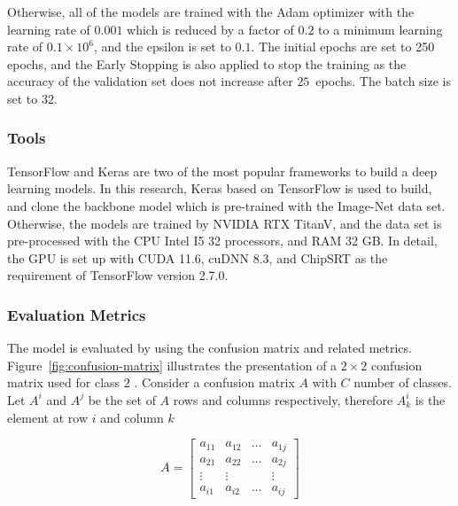 \documentclass[sensors,article,accept,pdftex,moreauthors]{Definitions/mdpi}
\begin{document}
	Otherwise, all of the models are trained with the Adam {optimizer} %
 \cite{6980} with the learning rate of $0.001$ which is reduced by a factor of $0.2$ to a minimum learning rate of $0.1 \times 10^6$, and the epsilon is set to $0.1$. The initial epochs are set to 250 epochs, and the Early Stopping is also applied to stop the training as the accuracy of the validation set does not increase after $25$~epochs. The batch size is set to $32$.
	
	\subsubsection{Tools}
	TensorFlow and Keras are two of the most popular frameworks to build a deep learning models. In this research, Keras based on TensorFlow is used to build, and clone the backbone model which is pre-trained with the Image-Net data set. Otherwise, the models are trained by NVIDIA RTX TitanV, and the data set is pre-processed with the CPU Intel I5 32 processors, and RAM 32 GB. In detail, the GPU is set up with CUDA 11.6, cuDNN 8.3, and ChipSRT as the requirement of TensorFlow version 2.7.0.
	\subsubsection{Evaluation Metrics}

	The model is evaluated by using the confusion matrix and related metrics. Figure~\ref{fig:confusion-matrix} illustrates the presentation of a $2 \times 2$ confusion matrix used for class $2$ . Consider a confusion matrix $A$ with $C$ number of classes. Let $A^i$ and $A^j$ be the set of $A$ rows and columns respectively, therefore $A^i_k$ is the element at row $i$ and column $k$
	
	\[
	A = \begin{bmatrix}
		a_{11} & a_{12} & \dots & a_{1j} \\
		a_{21} & a_{22} & \dots & a_{2j} \\
		\vdots & \vdots	&  & \vdots\\
		a_{i1} & a_{i2} & \dots & a_{ij} 
	\end{bmatrix}
	\]
\end{document}
